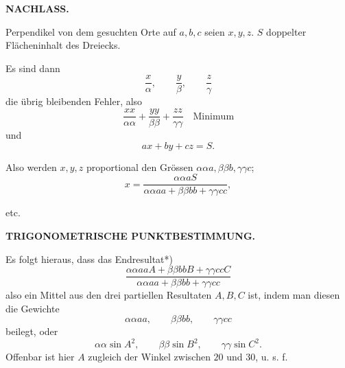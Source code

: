 \par\clearpage
\noindent{}\hfill{\small\textbf{NACHLASS.}}\hfill\null\par\medskip

Perpendikel von dem gesuchten Orte auf \(a,b,c\) seien \(x,y,z\). \(S\) doppelter Flächeninhalt des Dreiecks.

Es sind dann
\[
 \frac{x}{\alpha},\qquad \frac{y}{\beta},\qquad \frac{z}{\gamma}
\]
\noindent die übrig bleibenden Fehler, also
\[
 \frac{xx}{\alpha\alpha}+\frac{yy}{\beta\beta}+\frac{zz}{\gamma\gamma}
 \quad\text{Minimum}
\]
\noindent und
\[
 ax+by+cz=S.
\]

Also werden \(x,y,z\) proportional den Grössen \(\alpha\alpha a,\beta\beta b,\gamma\gamma c\);
\[
 x=\frac{\alpha\alpha aS}{\alpha\alpha aa+\beta\beta bb+\gamma\gamma cc},
\]
{\centering etc.\par}

\]

\par\clearpage
\noindent\null\hfill{\small\textbf{TRIGONOMETRISCHE PUNKTBESTIMMUNG.}}\hfill{}\par\medskip

Es folgt hieraus, dass das Endresultat*)
\[
 \frac{\alpha\alpha aaA+\beta\beta bbB+\gamma\gamma ccC}
      {\alpha\alpha aa+\beta\beta bb+\gamma\gamma cc}
\]
\noindent also ein Mittel aus den drei partiellen Resultaten \(A,B,C\) ist, indem man diesen die Gewichte
\[
 \alpha\alpha aa,\qquad \beta\beta bb,\qquad \gamma\gamma cc
\]
\noindent beilegt, oder
\[
 \alpha\alpha\sin A^2,\qquad
 \beta\beta\sin B^2,\qquad
 \gamma\gamma\sin C^2.
\]
Offenbar ist hier \(A\) zugleich der Winkel zwischen \(20\) und \(30\), u. s. f.

